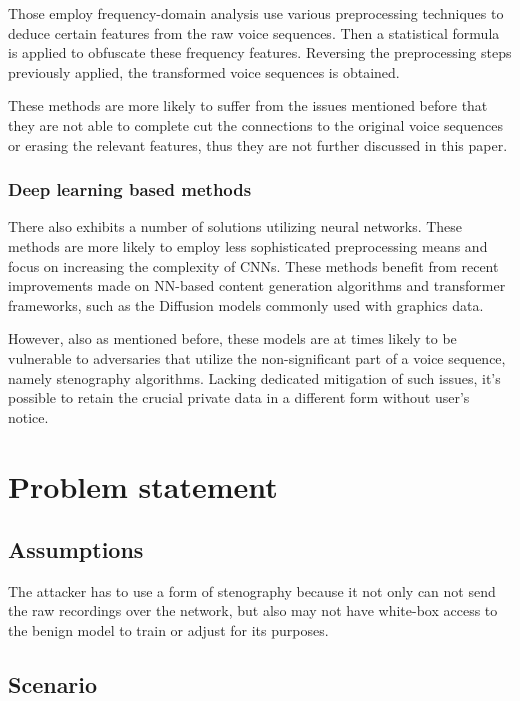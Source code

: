 \documentclass[journal]{IEEEtran} %
\begin{document}
Those employ frequency-domain analysis use various preprocessing techniques to deduce certain features from the raw voice sequences. Then a statistical formula is applied to obfuscate these frequency features. Reversing the preprocessing steps previously applied, the transformed voice sequences is obtained.\cite{a9, a10, a11}

These methods are more likely to suffer from the issues mentioned before that they are not able to complete cut the connections to the original voice sequences or erasing the relevant features, thus they are not further discussed in this paper.

\subsubsection{Deep learning based methods}

There also exhibits a number of solutions utilizing neural networks. These methods are more likely to employ less sophisticated preprocessing means and focus on increasing the complexity of CNNs. These methods benefit from recent improvements made on NN-based content generation algorithms and transformer frameworks, such as the Diffusion models commonly used with graphics data.\cite{a8}

However, also as mentioned before, these models are at times likely to be vulnerable to adversaries that utilize the non-significant part of a voice sequence, namely stenography algorithms. Lacking dedicated mitigation of such issues, it's possible to retain the crucial private data in a different form without user's notice.

\section{Problem statement}
\label{seg:problem}

\subsection{Assumptions}

The attacker has to use a form of stenography because it not only can not send the raw recordings over the network, but also may not have white-box access to the benign model to train or adjust for its purposes.

\subsection{Scenario}
\end{document}
